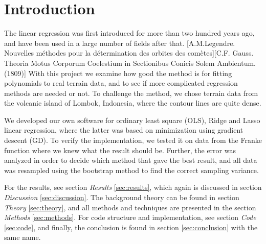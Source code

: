 \section{Introduction} \label{sec:introduction}
The linear regression was first introduced for more than two hundred years ago, and have been used in a large number of fields after that. [A.M.Legendre. Nouvelles méthodes pour la détermination des orbites des comètes][C.F. Gauss. Theoria Motus Corporum Coelestium in Sectionibus Conicis Solem Ambientum. (1809)] With this project we examine how good the method is for fitting polynomials to real terrain data, and to see if more complicated regression methods are needed or not. To challenge the method, we chose terrain data from the volcanic island of Lombok, Indonesia, where the contour lines are quite dense. 

We developed our own software for ordinary least square (OLS), Ridge and Lasso linear regression, where the latter was based on minimization using gradient descent (GD). To verify the implementation, we tested it on data from the Franke function where we knew what the result should be. Further, the error was analyzed in order to decide which method that gave the best result, and all data was resampled using the bootstrap method to find the correct sampling variance. 

For the results, see section \textit{Results} \eqref{sec:results}, which again is discussed in section \textit{Discussion} \eqref{sec:discussion}. The background theory can be found in section \textit{Theory} \eqref{sec:theory}, and all methods and techniques are presented in the section \textit{Methods} \eqref{sec:methods}. For code structure and implementation, see section \textit{Code} \eqref{sec:code}, and finally, the conclusion is found in section \eqref{sec:conclusion} with the same name.